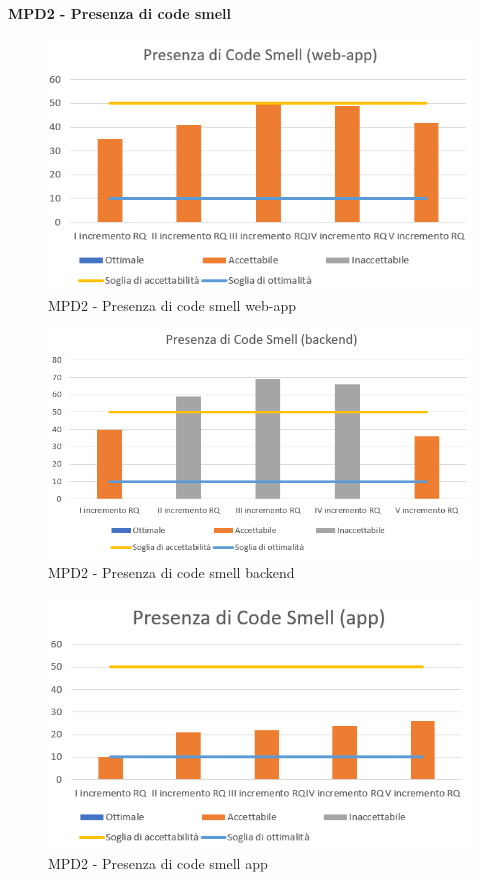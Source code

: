   \clearpage
  \paragraph{MPD2 - Presenza di code smell}
  \begin{figure}[h!]
    \centering
      \includegraphics[scale=1]{Immagini/CodeSmell WA.PNG}
    \caption{MPD2 - Presenza di code smell web-app}
  \end{figure}

  \begin{figure}[h!]
    \centering
      \includegraphics[scale=1]{Immagini/CodeSmell BE.PNG}
    \caption{MPD2 - Presenza di code smell backend}
  \end{figure}

  \begin{figure}[h!]
    \centering
      \includegraphics[scale=1]{Immagini/CodeSmell APP.PNG}
    \caption{MPD2 - Presenza di code smell app}
  \end{figure}



